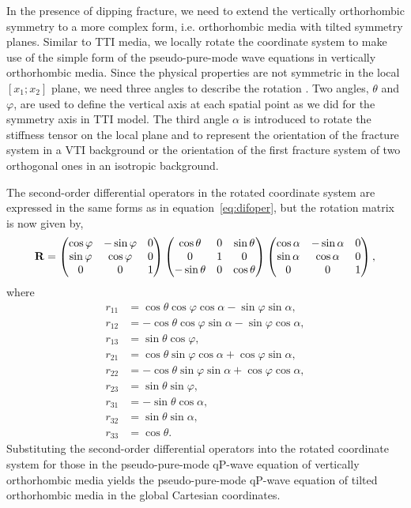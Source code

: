 In the presence of dipping fracture, we need to extend the vertically orthorhombic
 symmetry to a more complex form, i.e. orthorhombic media with tilted symmetry planes.
 Similar to TTI media, we locally rotate the coordinate system to make use of the simple form of the pseudo-pure-mode wave equations
 in vertically orthorhombic media. Since the physical properties are not symmetric in the local $[x_{1};x_{2}]$ plane, we need three angles
 to describe the rotation \cite[]{zhang.zhang:2011}. Two angles, $\theta$ and $\varphi$, are used to define the vertical axis at each
 spatial point as we did for the symmetry axis in TTI model. The third angle $\alpha$ is introduced to rotate the stiffness tensor 
on the local  plane and to represent the orientation of the fracture system in a VTI background or the orientation of the first
 fracture system of two orthogonal ones in an isotropic background.

The second-order differential operators in the rotated coordinate system are expressed in 
the same forms as in equation~\ref{eq:difoper}, but the rotation matrix is now given by,
\begin{equation}
\mathbf{R}=
\begin{pmatrix}\cos{\varphi} & -\sin{\varphi} &0 \cr
          \sin{\varphi} & \cos{\varphi} &0 \cr
          0 & 0 & 1\end{pmatrix}
\begin{pmatrix}\cos{\theta} & 0 & \sin{\theta} \cr
          0 & 1 & 0 \cr
          -\sin{\theta} & 0 & \cos{\theta}\end{pmatrix}
\begin{pmatrix}\cos{\alpha}  &-\sin{\alpha} &0 \cr
          \sin{\alpha} &\cos{\alpha} &0 \cr
          0 & 0 & 1\end{pmatrix},
\end{equation}
where
\begin{equation}
\begin{split}
r_{11}&=\cos{\theta}\cos{\varphi}\cos{\alpha}-\sin{\varphi}\sin{\alpha}, \\
r_{12}&=-\cos{\theta}\cos{\varphi}\sin{\alpha}-\sin{\varphi}\cos{\alpha}, \\
r_{13}&=\sin{\theta}\cos{\varphi},  \\
r_{21}&=\cos{\theta}\sin{\varphi}\cos{\alpha}+\cos{\varphi}\sin{\alpha}, \\
r_{22}&=-\cos{\theta}\sin{\varphi}\sin{\alpha}+\cos{\varphi}\cos{\alpha}, \\
r_{23}&=\sin{\theta}\sin{\varphi}, \\
r_{31}&=-\sin{\theta}\cos{\alpha}, \\
r_{32}&=\sin{\theta}\sin{\alpha}, \\
r_{33}&=\cos{\theta}.
\end{split}
\end{equation}
Substituting the second-order differential operators into the rotated coordinate system for
 those in the pseudo-pure-mode qP-wave equation
of vertically orthorhombic media yields the pseudo-pure-mode qP-wave equation of 
tilted orthorhombic media in the global Cartesian coordinates.

